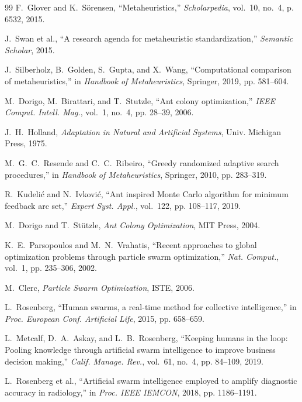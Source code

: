 \documentclass[journal,compsoc]{IEEEtran}
\begin{document}
\begin{thebibliography}{99}
F.~Glover and K.~Sörensen, ``Metaheuristics,'' \emph{Scholarpedia}, vol.~10, no.~4, p. 6532, 2015.

J.~Swan et al., ``A research agenda for metaheuristic standardization,'' \emph{Semantic Scholar}, 2015.

J.~Silberholz, B.~Golden, S.~Gupta, and X.~Wang, ``Computational comparison of metaheuristics,'' in \emph{Handbook of Metaheuristics}, Springer, 2019, pp. 581--604.

M.~Dorigo, M.~Birattari, and T.~Stutzle, ``Ant colony optimization,'' \emph{IEEE Comput. Intell. Mag.}, vol.~1, no.~4, pp. 28--39, 2006.

J.~H.~Holland, \emph{Adaptation in Natural and Artificial Systems}, Univ. Michigan Press, 1975.

M.~G.~C.~Resende and C.~C.~Ribeiro, ``Greedy randomized adaptive search procedures,'' in \emph{Handbook of Metaheuristics}, Springer, 2010, pp. 283--319.

R.~Kudelić and N.~Ivković, ``Ant inspired Monte Carlo algorithm for minimum feedback arc set,'' \emph{Expert Syst. Appl.}, vol.~122, pp. 108--117, 2019.

M.~Dorigo and T.~Stützle, \emph{Ant Colony Optimization}, MIT Press, 2004.

K.~E.~Parsopoulos and M.~N.~Vrahatis, ``Recent approaches to global optimization problems through particle swarm optimization,'' \emph{Nat. Comput.}, vol.~1, pp. 235--306, 2002.

M.~Clerc, \emph{Particle Swarm Optimization}, ISTE, 2006.

L.~Rosenberg, ``Human swarms, a real-time method for collective intelligence,'' in \emph{Proc. European Conf. Artificial Life}, 2015, pp. 658--659.

L.~Metcalf, D.~A.~Askay, and L.~B.~Rosenberg, ``Keeping humans in the loop: Pooling knowledge through artificial swarm intelligence to improve business decision making,'' \emph{Calif. Manage. Rev.}, vol.~61, no.~4, pp. 84--109, 2019.

L.~Rosenberg et al., ``Artificial swarm intelligence employed to amplify diagnostic accuracy in radiology,'' in \emph{Proc. IEEE IEMCON}, 2018, pp. 1186--1191.


\end{thebibliography}
\end{document}
